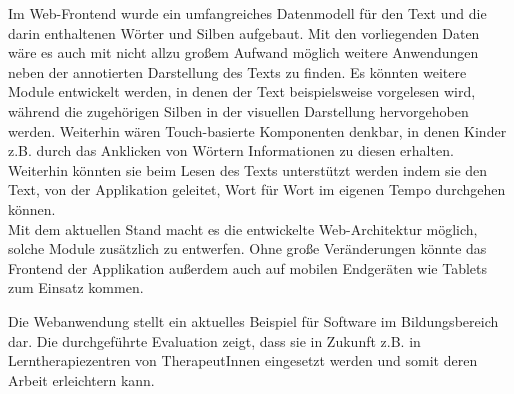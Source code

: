 Im Web-Frontend wurde ein umfangreiches Datenmodell für den Text und die darin enthaltenen Wörter und Silben aufgebaut. Mit den vorliegenden Daten wäre es auch mit nicht allzu großem Aufwand möglich weitere Anwendungen neben der annotierten Darstellung des Texts zu finden. Es könnten weitere Module entwickelt werden, in denen der Text beispielsweise vorgelesen wird, während die zugehörigen Silben in der visuellen Darstellung hervorgehoben werden. Weiterhin wären Touch-basierte Komponenten denkbar, in denen Kinder z.B. durch das Anklicken von Wörtern Informationen zu diesen erhalten. Weiterhin könnten sie beim Lesen des Texts unterstützt werden indem sie den Text, von der Applikation geleitet, Wort für Wort im eigenen Tempo durchgehen können.\\
Mit dem aktuellen Stand macht es die entwickelte Web-Architektur möglich, solche Module zusätzlich zu entwerfen. Ohne große Veränderungen könnte das Frontend der Applikation außerdem auch auf mobilen Endgeräten wie Tablets zum Einsatz kommen.

Die Webanwendung stellt ein aktuelles Beispiel für Software im Bildungsbereich dar. Die durchgeführte Evaluation zeigt, dass sie in Zukunft z.B. in Lerntherapiezentren von TherapeutInnen eingesetzt werden und somit deren Arbeit erleichtern kann.